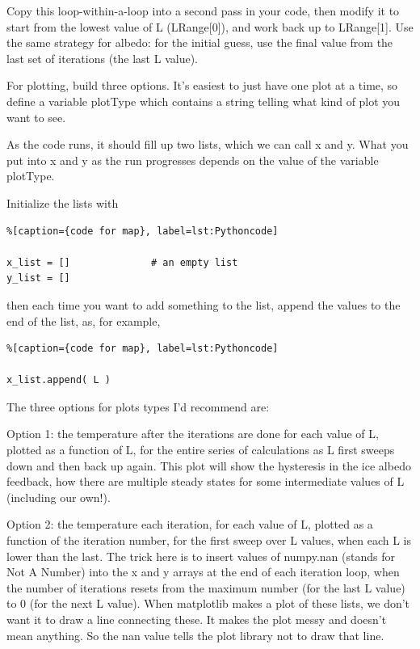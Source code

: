 {Copy this loop-within-a-loop into a second pass in your code, then modify it to start from the lowest value of L (LRange[0]), and work back up to LRange[1]. Use the same strategy for albedo: for the initial guess, use the final value from the last set of iterations (the last L value).

For plotting, build three options. It's easiest to just have one plot at a time, so define a variable plotType which contains a string telling what kind of plot you want to see.

As the code runs, it should fill up two lists, which we can call x and y. What you put into x and y as the run progresses depends on the value of the variable plotType.

Initialize the lists with

\begin{lstlisting}%[caption={code for map}, label=lst:Pythoncode]

x_list = []              # an empty list
y_list = []
\end{lstlisting}

then each time you want to add something to the list, append the values to the end of the list, as, for example,

\begin{lstlisting}%[caption={code for map}, label=lst:Pythoncode]

x_list.append( L )
\end{lstlisting}

The three options for plots types I'd recommend are:

Option 1: the temperature after the iterations are done for each value of L, plotted as a function of L, for the entire series of calculations as L first sweeps down and then back up again. This plot will show the hysteresis in the ice albedo feedback, how there are multiple steady states for some intermediate values of L (including our own!).

Option 2: the temperature each iteration, for each value of L, plotted as a function of the iteration number, for the first sweep over L values, when each L is lower than the last. The trick here is to insert values of numpy.nan (stands for Not A Number) into the x and y arrays at the end of each iteration loop, when the number of iterations resets from the maximum number (for the last L value) to 0 (for the next L value). When matplotlib makes a plot of these lists, we don't want it to draw a line connecting these. It makes the plot messy and doesn't mean anything. So the nan value tells the plot library not to draw that line.

}
